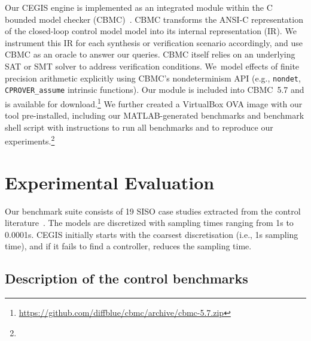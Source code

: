 Our CEGIS engine is implemented as an integrated module within the C bounded
model checker (CBMC)~\cite{ClarkeKL04}.  CBMC transforms the ANSI-C representation
of the closed-loop control model model into its internal representation (IR).  We
instrument this IR for each synthesis or verification scenario accordingly,
and use CBMC as an oracle to answer our queries.  CBMC itself relies on an
underlying SAT or SMT solver to address verification conditions.  We~model
effects of finite precision arithmetic 
explicitly using CBMC's nondeterminism API (e.g., \texttt{nondet},
\texttt{CPROVER\_assume} intrinsic functions).  Our module is included into
CBMC~5.7 and is available for
download.\footnote{\url{https://github.com/diffblue/cbmc/archive/cbmc-5.7.zip}}
We further created a VirtualBox OVA image with our tool pre-installed,
including our MATLAB-generated benchmarks and benchmark shell script with
instructions to run all benchmarks and to reproduce our
experiments.\footnote{}
%
%

\section{Experimental Evaluation}
\label{exp:evaluation}

Our benchmark suite consists of 19 SISO case studies extracted from the 
control literature~\cite{acrobot,cstr,CHEN1979389,KOKOTOVIC198023,gajic2008optimal,Franklin15, maglev, converters, CTMS, gajic2008optimal}. 
The models are discretized with sampling times ranging from 1s to 0.0001s. CEGIS initially starts with the coarsest discretisation (i.e., 1s sampling time), and if it fails to find a controller, reduces the sampling time. 

\subsection{Description of the control benchmarks}
\label{exp:benchmarks}

